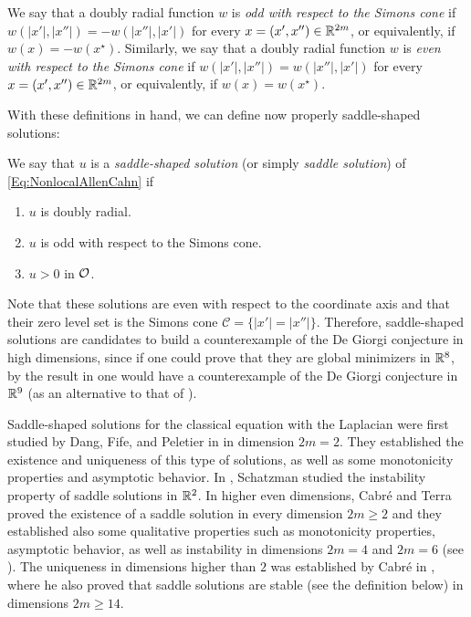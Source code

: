 \begin{definition}
\label{Def:OddwrtSimonsCone}
We say that a doubly radial function $w$ is \emph{odd with respect to the Simons cone} if $w(|x'|,|x''|) = -w(|x''|,|x'|)$ for every $x = (x', x'') \in \mathbb{R}^{2m}$, or equivalently, if $w(x) = -w(x^\star)$. Similarly, we say that a doubly radial function $w$ is \emph{even with respect to the Simons cone} if $w(|x'|,|x''|) = w(|x''|,|x'|)$ for every $x = (x', x'') \in \mathbb{R}^{2m}$, or equivalently, if $w(x) = w(x^\star)$.
\end{definition}

With these definitions in hand, we can define now properly saddle-shaped solutions:
\begin{definition}
\label{Def:SaddleShapedSol}
We say that $u$ is a \emph{saddle-shaped solution} (or simply \emph{saddle solution}) of \eqref{Eq:NonlocalAllenCahn} if
\begin{enumerate}
\item $u$ is doubly radial.
\item $u$ is odd with respect to the Simons cone.
\item $u > 0$ in $\mathcal{O}$.
\end{enumerate}
\end{definition}


Note that these solutions are even with respect to the coordinate axis and that their zero level set is the Simons cone $\mathscr{C} = \{|x'|=|x''|\}$. Therefore, saddle-shaped solutions are candidates to build a counterexample of the De Giorgi conjecture in high dimensions, since if one could prove that they are global minimizers in $\mathbb{R}^8$, by the result in \cite{JerisonMonneau} one would have a counterexample of the De Giorgi conjecture in $\mathbb{R}^9$ (as an alternative to that of \cite{delPinoKowalczykWei}).

Saddle-shaped solutions for the classical equation with the Laplacian were first studied by Dang, Fife, and Peletier in \cite{DangFifePeletier} in dimension $2m=2$. They established the existence and uniqueness of this type of solutions, as well as some monotonicity properties and asymptotic behavior. In \cite{Schatzman}, Schatzman studied the instability property of saddle solutions in $\mathbb{R}^2$. In higher even dimensions, Cabré and Terra  proved the existence of a saddle solution in every dimension $2m\geq 2$ and they established also some qualitative properties such as monotonicity properties, asymptotic behavior, as well as instability in dimensions $2m = 4$ and $2m = 6$ (see \cite{CabreTerraI,CabreTerraII}). The uniqueness in dimensions higher than $2$ was established by Cabré in \cite{Cabre-Saddle}, where he also proved that saddle solutions are stable (see the definition below) in dimensions $2m \geq 14$.

